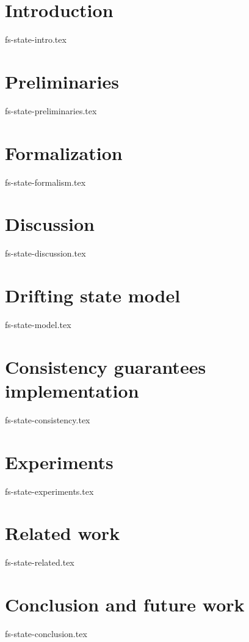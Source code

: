 \documentclass{vldb}
\theoremstyle{definition}
\begin{document}
\section {Introduction}
 {fs-state-intro.tex}

\section {Preliminaries}
 {fs-state-preliminaries.tex}

\section {Formalization}
 {fs-state-formalism.tex}

\section {Discussion}
 {fs-state-discussion.tex}

\section {Drifting state model}
 {fs-state-model.tex}

\section{Consistency guarantees implementation}
 {fs-state-consistency.tex}

\section {Experiments}
 {fs-state-experiments.tex}

\section {Related work}
 {fs-state-related.tex}

\section {Conclusion and future work}
 {fs-state-conclusion.tex}

\balance



\end{document}
